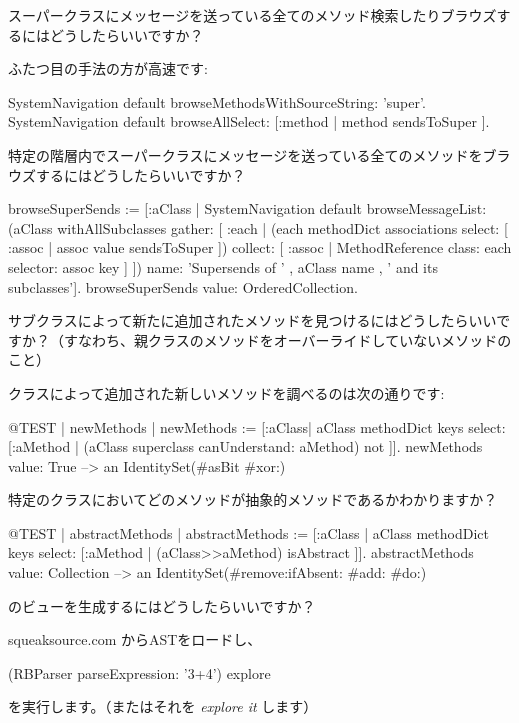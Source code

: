 \documentclass[a4paper,10pt,twoside]{book}
\begin{document}
\begin{faq}
スーパークラスにメッセージを送っている全てのメソッド検索したりブラウズするにはどうしたらいいですか？
\end{faq}
\answer
ふたつ目の手法の方が高速です:
\begin{code}{}
SystemNavigation default browseMethodsWithSourceString: 'super'.
SystemNavigation default browseAllSelect: [:method | method sendsToSuper ].
\end{code}

\begin{faq}
特定の階層内でスーパークラスにメッセージを送っている全てのメソッドをブラウズするにはどうしたらいいですか？
\end{faq}
\answer
\begin{code}{}
browseSuperSends := [:aClass | SystemNavigation default
	browseMessageList: (aClass withAllSubclasses gather: [ :each |
		(each methodDict associations
			select: [ :assoc | assoc value sendsToSuper ])
				collect: [ :assoc | MethodReference class: each selector: assoc key ] ])
	name: 'Supersends of ' , aClass name , ' and its subclasses'].
browseSuperSends value: OrderedCollection.
\end{code}

\begin{faq}
サブクラスによって新たに追加されたメソッドを見つけるにはどうしたらいいですか？（すなわち、親クラスのメソッドをオーバーライドしていないメソッドのこと）
\end{faq}
\answer
{}クラスによって追加された新しいメソッドを調べるのは次の通りです:
\begin{code}{@TEST | newMethods |}
newMethods := [:aClass| aClass methodDict keys select:
	[:aMethod | (aClass superclass canUnderstand: aMethod) not ]].
newMethods value: True --> an IdentitySet(#asBit #xor:)
\end{code}

\begin{faq}
特定のクラスにおいてどのメソッドが抽象的メソッドであるかわかりますか？
\end{faq}
\answer
\begin{code}{@TEST | abstractMethods |}
abstractMethods :=
	[:aClass | aClass methodDict keys select:
		[:aMethod | (aClass>>aMethod) isAbstract ]].
abstractMethods value: Collection --> an IdentitySet(#remove:ifAbsent: #add: #do:)
\end{code}

\begin{faq}
 のビューを生成するにはどうしたらいいですか？
\end{faq}
\answer
squeaksource.com からASTをロードし、
\begin{code}{}
(RBParser parseExpression: '3+4') explore
\end{code}
を実行します。（またはそれを \emph{explore it} します）
\end{document}
